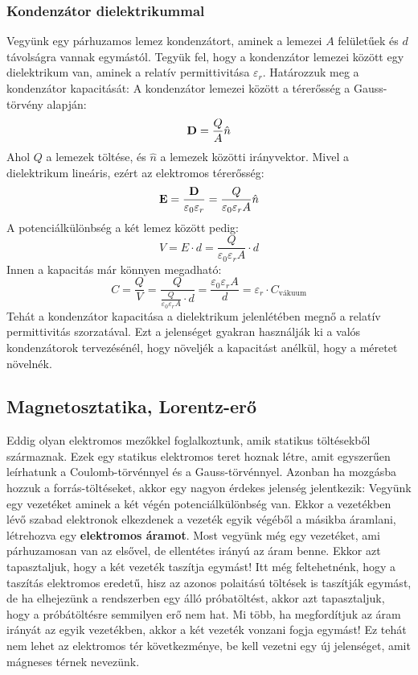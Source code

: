 \documentclass[a4paper,12pt]{article}
\begin{document}
\subsubsection{Kondenzátor dielektrikummal}
Vegyünk egy párhuzamos lemez kondenzátort, aminek a lemezei $A$ felületűek és $d$ távolságra vannak egymástól. Tegyük fel, hogy a kondenzátor lemezei között egy dielektrikum van, aminek a relatív permittivitása $\varepsilon_r$. Határozzuk meg a kondenzátor kapacitását:
A kondenzátor lemezei között a térerősség a Gauss-törvény alapján:
\begin{equation}
    \bold{D} = \frac{Q}{A} \hat{n}
\end{equation}
Ahol $Q$ a lemezek töltése, és $\hat{n}$ a lemezek közötti irányvektor. Mivel a dielektrikum lineáris, ezért az elektromos térerősség:
\begin{equation}
    \bold{E} = \frac{\bold{D}}{\varepsilon_0 \varepsilon_r} = \frac{Q}{\varepsilon_0 \varepsilon_r A} \hat{n}
\end{equation}
A potenciálkülönbség a két lemez között pedig:
\begin{equation}
    V = E \cdot d = \frac{Q}{\varepsilon_0 \varepsilon_r A} \cdot d
\end{equation}
Innen a kapacitás már könnyen megadható:
\begin{equation}
    C = \frac{Q}{V} = \frac{Q}{\frac{Q}{\varepsilon_0 \varepsilon_r A} \cdot d} = \frac{\varepsilon_0 \varepsilon_r A}{d} = \varepsilon_r \cdot C_{\text{vákuum}}
\end{equation}
Tehát a kondenzátor kapacitása a dielektrikum jelenlétében megnő a relatív permittivitás szorzatával. Ezt a jelenséget gyakran használják ki a valós kondenzátorok tervezésénél, hogy növeljék a kapacitást anélkül, hogy a méretet növelnék.

\subsection{Magnetosztatika, Lorentz-erő}
Eddig olyan elektromos mezőkkel foglalkoztunk, amik statikus töltésekből származnak. Ezek egy statikus elektromos teret hoznak létre, amit egyszerűen leírhatunk a Coulomb-törvénnyel és a Gauss-törvénnyel.
Azonban ha mozgásba hozzuk a forrás-töltéseket, akkor egy nagyon érdekes jelenség jelentkezik: Vegyünk egy vezetéket aminek a két végén potenciálkülönbség van.
Ekkor a vezetékben lévő szabad elektronok elkezdenek a vezeték egyik végéből a másikba áramlani, létrehozva egy \textbf{elektromos áramot}. Most vegyünk még egy vezetéket, ami párhuzamosan van az elsővel,
de ellentétes irányú az áram benne. Ekkor azt tapasztaljuk, hogy a két vezeték taszítja egymást! Itt még feltehetnénk, hogy a taszítás elektromos eredetű, hisz az azonos polaitású töltések is taszítják egymást, de
ha elhejezünk a rendszerben egy álló próbatöltést, akkor azt tapasztaljuk, hogy a próbátöltésre semmilyen erő nem hat. Mi több, ha megfordítjuk az áram irányát az egyik vezetékben, akkor a két vezeték vonzani fogja egymást!
Ez tehát nem lehet az elektromos tér következménye, be kell vezetni egy új jelenséget, amit mágneses térnek nevezünk.
\end{document}

